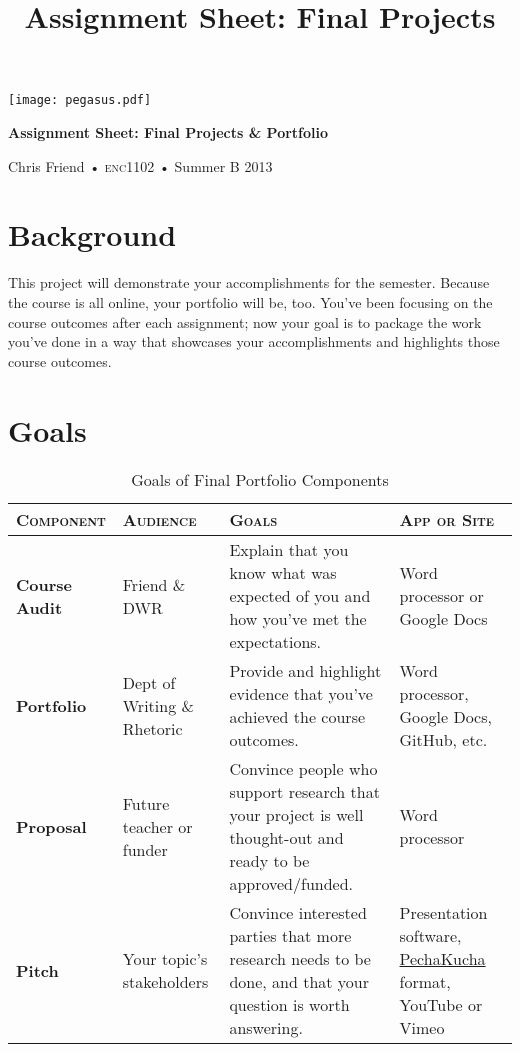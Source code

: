 \documentclass[12pt,oneside]{amsart}	%
\title[Final Projects]{Assignment Sheet: Final Projects}
\begin{document}
%
\thispagestyle{empty}

\vspace{-2in}
\begin{center}
\huge
{\texttt{[image: pegasus.pdf]}}

\textbf{Assignment Sheet: Final Projects \& Portfolio}

{\normalsize Chris Friend • \textsc{enc1102} • Summer B 2013}
\end{center}
\vspace{1.5\baselineskip}

\section{Background} %
\label{sec:background}
This project will demonstrate your accomplishments for the semester. Because the course is all online, your portfolio will be, too. You've been focusing on the course outcomes after each assignment; now your goal is to package the work you've done in a way that showcases your accomplishments and highlights those course outcomes.

\section{Goals} %
\label{sec:Goals}
\begin{table}[b]\small
	\caption{Goals of Final Portfolio Components}\label{tab:goals}
\begin{tabulary}{\textwidth}{lLLL}
	\toprule  \textbf{\textsc{Component}} & \textbf{\textsc{Audience}} & \textbf{\textsc{Goals}} & \textbf{\textsc{App or Site}}\\
\midrule	\textbf{Course Audit} & Friend \& DWR & Explain that you know what was expected of you and how you've met the expectations. & Word processor or Google Docs \\
\midrule	\textbf{Portfolio} & Dept of Writing \& Rhetoric  & Provide and highlight evidence that you've achieved the course outcomes. & Word processor, Google Docs, GitHub, etc. \\
\midrule	\textbf{Proposal} & Future teacher or funder & Convince people who support research that your project is well thought-out and ready to be approved/funded. & Word processor \\
\midrule	\textbf{Pitch} & Your topic's stakeholders & Convince interested parties that more research needs to be done, and that your question is worth answering. & Presentation software, \href{http://www.pechakucha.org/}{PechaKucha} format, YouTube or Vimeo \\
	\bottomrule
\end{tabulary}
\end{table}
\end{document}
